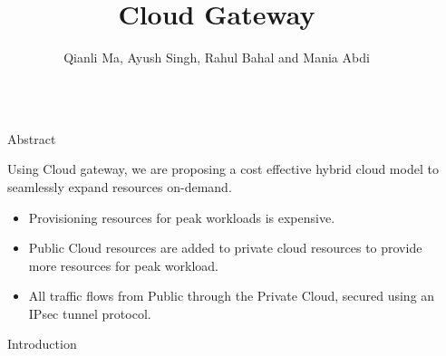 \documentclass[final]{beamer}
\title{Cloud Gateway} %
\author{Qianli Ma, Ayush Singh, Rahul Bahal and Mania Abdi} %
\institute{College of Computer and Information Science, Northeastern University} %
\newlength{\sepwid}
\newlength{\onecolwid}
\begin{document}

\setlength{\belowcaptionskip}{2ex} %
\setlength\belowdisplayshortskip{2ex} %

\begin{frame}[t] %

\begin{columns}[t] %

\begin{column}{\sepwid}\end{column} %

\begin{column}{\onecolwid} %


\begin{alertblock}{Abstract}

Using Cloud gateway, we are proposing a cost effective hybrid cloud model to seamlessly expand resources on-demand.
\begin{itemize}
\item Provisioning resources for peak workloads is expensive.
\item Public Cloud resources are added to private cloud resources to provide more resources for peak workload.
\item All traffic flows from Public through the Private Cloud, secured using an IPsec tunnel protocol.
\end{itemize}

\end{alertblock}


\begin{block}{Introduction}


\end{block}
\end{column}
\end{columns}
\end{frame}
\end{document}
